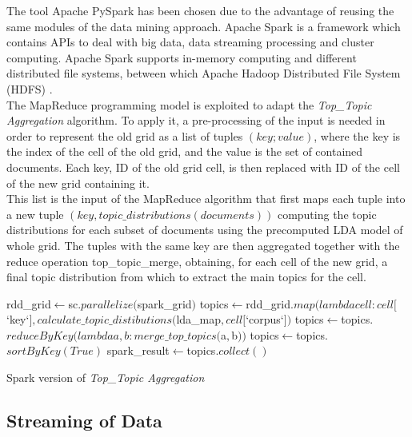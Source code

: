 The tool Apache PySpark \cite{pyspark} has been chosen due to the advantage of reusing the same modules of the data mining approach. Apache Spark is a framework which contains APIs to deal with big data, data streaming processing and cluster computing. Apache Spark supports in-memory computing and different distributed file systems, between which Apache Hadoop Distributed File System (HDFS\texttrademark) \cite{hadoop}.\\
The MapReduce programming model is exploited to adapt the \emph{Top\_Topic Aggregation} algorithm. To apply it, a pre-processing of the input is needed in order to represent the old grid as a list of tuples $(key; value)$, where the key is the index of the cell of the old grid, and the value is the set of contained documents. Each key, ID of the old grid cell, is then replaced with ID of the cell of the new grid containing it.\\ This list is the input of the MapReduce algorithm that first maps each tuple into a new tuple $(key, topic\_distributions(documents))$ computing the topic distributions for each subset of documents using the precomputed LDA model of whole grid. The tuples with the same key are then aggregated together with the reduce operation top\_topic\_merge, obtaining, for each cell of the new grid, a final topic distribution from which to extract the main topics for the cell.


\begin{algorithm}
  
    rdd\_grid$\leftarrow$sc.$parallelize($spark\_grid$)$\;
	topics$\leftarrow$rdd\_grid.$map(lambda cell: cell[$`key`$],calculate\_topic\_distibutions($lda\_map$, cell[$`corpus`$])$\;
    topics$\leftarrow$topics.$reduceByKey(lambda a,b: merge\_top\_topics($a$, $b$))$\;
	topics$\leftarrow$topics.$sortByKey(True)$\;
    spark\_result$\leftarrow$topics.$collect()$\;
    	
    \caption{Spark version of \emph{Top\_Topic Aggregation}}\label{alg3}
    
\end{algorithm}

\subsection{Streaming of Data}

